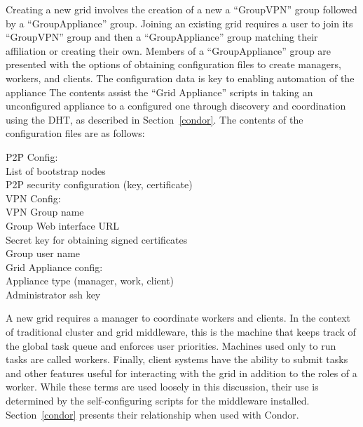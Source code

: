 \documentclass[conference]{IEEEtran}
\begin{document}
Creating a new grid involves the creation of a new a ``GroupVPN'' group
followed by a ``GroupAppliance'' group.  Joining an existing grid requires a
user to join its ``GroupVPN'' group and then a ``GroupAppliance'' group
matching their affiliation or creating their own.  Members of a
``GroupAppliance'' group are presented with the options of obtaining
configuration files to create managers, workers, and clients.  The
configuration data is key to enabling automation of the appliance  The contents
assist the ``Grid Appliance'' scripts in taking an unconfigured appliance to a
configured one through discovery and coordination using the DHT, as described
in Section~\ref{condor}.  The contents of the configuration files are as
follows:

\begin{tabbing}
P2\=P Config:\\
\> List of bootstrap nodes\\
\> P2P security configuration (key, certificate)\\
VPN Config:\\
\> VPN Group name\\
\> Group Web interface URL\\
\> Secret key for obtaining signed certificates\\
\> Group user name\\
Grid Appliance config:\\
\> Appliance type (manager, work, client)\\
\> Administrator ssh key\\
\end{tabbing}

A new grid requires a manager to coordinate workers and clients.  In the
context of traditional cluster and grid middleware, this is the machine that
keeps track of the global task queue and enforces user priorities.  Machines
used only to run tasks are called workers.  Finally, client systems have the
ability to submit tasks and other features useful for interacting with the grid
in addition to the roles of a worker.  While these terms are used loosely in
this discussion, their use is determined by the self-configuring scripts for
the middleware installed.  Section~\ref{condor} presents their relationship
when used with Condor.
\end{document}
